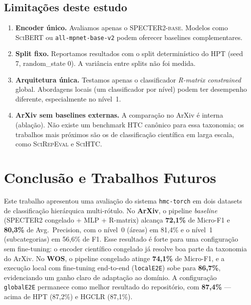 \documentclass[11pt,a4paper,twoside]{article}
\begin{document}
\subsection{Limitações deste estudo}

\begin{enumerate}[leftmargin=*, itemsep=2pt]
  \item \textbf{Encoder único.} Avaliamos apenas o \textsc{SPECTER2-base}.
        Modelos como \textsc{SciBERT} \cite{beltagy2019scibert} ou
        \texttt{all-mpnet-base-v2} podem oferecer baselines complementares.
  \item \textbf{Split fixo.} Reportamos resultados com o split determinístico
        do HPT (seed 7, random\_state 0). A variância entre splits não foi medida.
  \item \textbf{Arquitetura única.} Testamos apenas o classificador
        \textit{R-matrix constrained} global. Abordagens locais (um classificador
        por nível) podem ter desempenho diferente, especialmente no nível~1.
  \item \textbf{ArXiv sem baselines externas.} A comparação no ArXiv é interna
        (ablação). Não existe um benchmark HTC canônico para essa taxonomia;
        os trabalhos mais próximos são os de classificação científica em larga
        escala, como \textsc{SciRepEval} e \textsc{SciHTC}.
\end{enumerate}

\section{Conclusão e Trabalhos Futuros}
\label{sec:conclusion}

Este trabalho apresentou uma avaliação do sistema \texttt{hmc-torch} em dois
datasets de classificação hierárquica multi-rótulo. No \textbf{ArXiv}, o pipeline
\textit{baseline} (SPECTER2 congelado + MLP + R-matrix) alcança
\textbf{72,1\%} de Micro-F1 e \textbf{80,3\%} de Avg.\ Precision, com o
nível~0 (áreas) em 81,4\% e o nível~1 (subcategorias) em 56,6\% de F1.
Esse resultado é forte para uma configuração sem fine-tuning: o encoder
científico congelado já resolve boa parte da taxonomia do ArXiv. No
\textbf{WOS}, o pipeline congelado atinge \textbf{74,1\%} de Micro-F1, e a
execução local com fine-tuning end-to-end (\texttt{localE2E}) sobe para
\textbf{86,7\%}, evidenciando um ganho claro de adaptação ao domínio.
A configuração \texttt{globalE2E} permanece como melhor resultado do repositório,
com \textbf{87,4\%} --- acima de HPT (87,2\%) e HGCLR (87,1\%).
\end{document}
